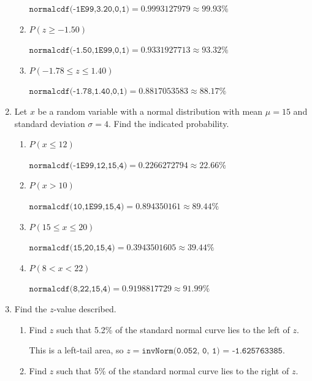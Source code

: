\documentclass{article}
\newcommand{\answer}[1]{\color{white}#1}
\begin{document}
\begin{enumerate}
\begin{enumerate}
	{\answer $\texttt{normalcdf(-1E99,3.20,0,1)} = 0.9993127979 \approx 99.93\%$
	} 
	
	\item $P(z \geq -1.50)$ 
	
	{\answer  $\texttt{normalcdf(-1.50,1E99,0,1)} = 0.9331927713 \approx 93.32\%$
	} 
	
	\item $P(-1.78 \leq z \leq 1.40)$ 
	
	{\answer  $\texttt{normalcdf(-1.78,1.40,0,1)} = 0.8817053583 \approx 88.17\%$
	} 
	\end{enumerate}


\item Let $x$ be a random variable with a normal distribution with mean $\mu = 15$ and standard deviation $\sigma = 4$.  Find the indicated probability.

	\begin{enumerate}
	\item $P(x \leq 12)$ 
	
	{\answer $\texttt{normalcdf(-1E99,12,15,4)} =  0.2266272794 \approx 22.66\%$
	} 
	
	\item $P(x > 10)$ 
	
	{\answer $\texttt{normalcdf(10,1E99,15,4)} =  0.894350161 \approx 89.44\%$
	} 
	
	\item $P(15 \leq x \leq 20)$ 
	
	{\answer $\texttt{normalcdf(15,20,15,4)} =  0.3943501605 \approx 39.44\%$
	} 
	
	\item $P(8 < x < 22)$ 
	
	{\answer $\texttt{normalcdf(8,22,15,4)} =  0.9198817729 \approx 91.99\%$
	} 
	\end{enumerate}

\item Find the $z$-value described.

	\begin{enumerate}
	
	\item Find $z$ such that 5.2\% of the standard normal curve lies to the left of $z$.  
	
	{\answer This is a left-tail area, so $z = \texttt{invNorm(0.052, 0, 1) = -1.625763385}$.
	} 

	\item Find $z$ such that 5\% of the standard normal curve lies to the right of $z$.  
	

\end{enumerate}
\end{enumerate}
\end{document}
